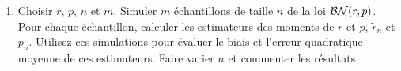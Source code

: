 \documentclass[12pt]{article}
\begin{document}
\begin{enumerate}
\vspace{3mm}

\item Choisir $r$, $p$, $n$ et $m$. Simuler $m$ échantillons de taille $n$ de la loi ${\cal BN}(r,p)$. Pour chaque échantillon, calculer les estimateurs des moments de $r$ et $p$, $\tilde{r}_n$ et $\tilde{p}_n$. Utilisez ces simulations pour évaluer le biais et l'erreur quadratique moyenne de ces estimateurs. Faire varier $n$ et commenter les résultats.

\end{enumerate}
\end{document}
